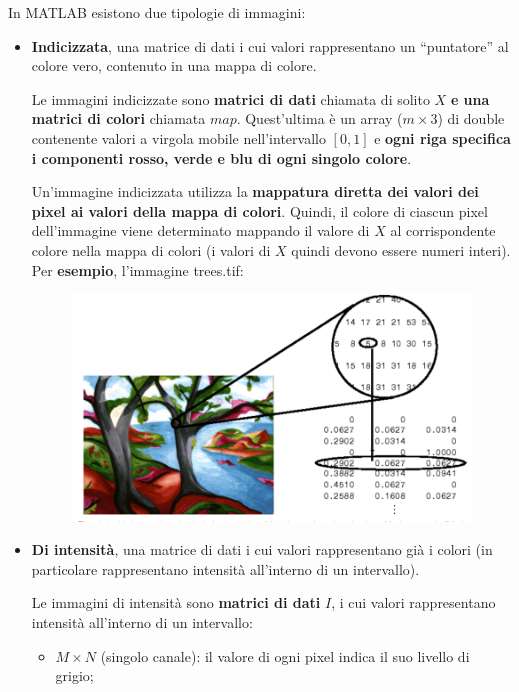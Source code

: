 \documentclass[a4paper]{article}
\newcommand{\dquotes}[1]{``#1''}
\begin{document}
	In MATLAB esistono due tipologie di immagini:
	\begin{itemize}
		\item \textbf{Indicizzata}, una matrice di dati i cui valori rappresentano un \dquotes{puntatore} al colore vero, contenuto in una mappa di colore.
		
		Le immagini indicizzate sono \textbf{matrici di dati} chiamata di solito $X$ \textbf{e una matrici di colori} chiamata $map$. Quest'ultima è un array ($m \times 3$) di double contenente valori a virgola mobile nell'intervallo $\left[0,1\right]$ e \textbf{ogni riga specifica i componenti rosso, verde e blu di ogni singolo colore}.
		
		Un'immagine indicizzata utilizza la \textbf{mappatura diretta dei valori dei pixel ai valori della mappa di colori}. Quindi, il colore di ciascun pixel dell'immagine viene determinato mappando il valore di $X$ al corrispondente colore nella mappa di colori (i valori di $X$ quindi devono essere numeri interi). Per \textcolor{Green4}{\textbf{esempio}}, l'immagine \textsf{trees.tif}:
		\begin{figure}[!htp]
			\centering
			\includegraphics[width=\textwidth]{img/lab/visualizzazione-segnali_4.png}
		\end{figure}\newpage
		
		\item \textbf{Di intensità}, una matrice di dati i cui valori rappresentano già i colori (in particolare rappresentano intensità all'interno di un intervallo).
		
		Le immagini di intensità sono \textbf{matrici di dati} $I$, i cui valori rappresentano intensità all'interno di un intervallo:
		\begin{itemize}
			\item $M \times N$ (singolo canale): il valore di ogni pixel indica il suo livello di grigio;
			

\end{itemize}
\end{itemize}
\end{document}
